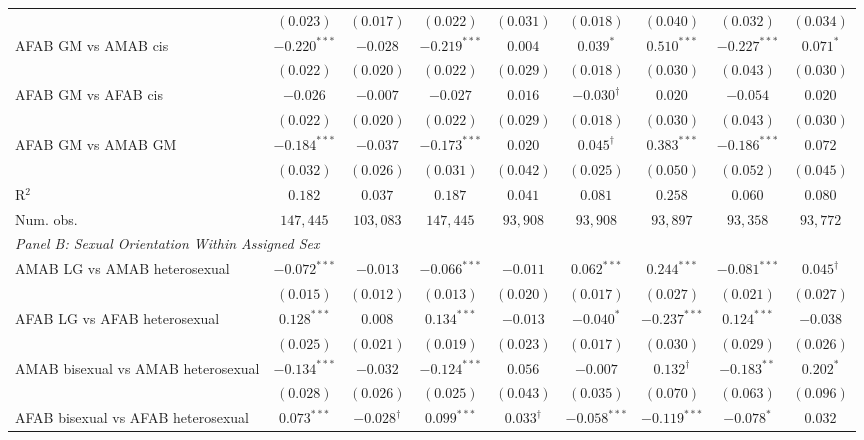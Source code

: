 \begin{table}[htpb!]
{\begin{tabular}{l c c c c c c c c}
 & $(0.023)$ & $(0.017)$ & $(0.022)$ & $(0.031)$ & $(0.018)$ & $(0.040)$ & $(0.032)$ & $(0.034)$ \\
AFAB GM vs AMAB cis & $-0.220^{***}$ & $-0.028$ & $-0.219^{***}$ & $0.004$ & $0.039^{*}$ & $0.510^{***}$ & $-0.227^{***}$ & $0.071^{*}$ \\
 & $(0.022)$ & $(0.020)$ & $(0.022)$ & $(0.029)$ & $(0.018)$ & $(0.030)$ & $(0.043)$ & $(0.030)$ \\
AFAB GM vs AFAB cis & $-0.026$ & $-0.007$ & $-0.027$ & $0.016$ & $-0.030^{\dagger}$ & $0.020$ & $-0.054$ & $0.020$ \\
 & $(0.022)$ & $(0.020)$ & $(0.022)$ & $(0.029)$ & $(0.018)$ & $(0.030)$ & $(0.043)$ & $(0.030)$ \\
AFAB GM vs AMAB GM & $-0.184^{***}$ & $-0.037$ & $-0.173^{***}$ & $0.020$ & $0.045^{\dagger}$ & $0.383^{***}$ & $-0.186^{***}$ & $0.072$ \\
 & $(0.032)$ & $(0.026)$ & $(0.031)$ & $(0.042)$ & $(0.025)$ & $(0.050)$ & $(0.052)$ & $(0.045)$ \\
\hline
R$^2$ & $0.182$ & $0.037$ & $0.187$ & $0.041$ & $0.081$ & $0.258$ & $0.060$ & $0.080$ \\
Num. obs. & $147,445$ & $103,083$ & $147,445$ & $93,908$ & $93,908$ & $93,897$ & $93,358$ & $93,772$ \\
\hline
\multicolumn{9}{l}{\textit{Panel B: Sexual Orientation Within Assigned Sex}} \\
AMAB LG vs AMAB heterosexual & $-0.072^{***}$ & $-0.013$ & $-0.066^{***}$ & $-0.011$ & $0.062^{***}$ & $0.244^{***}$ & $-0.081^{***}$ & $0.045^{\dagger}$ \\
 & $(0.015)$ & $(0.012)$ & $(0.013)$ & $(0.020)$ & $(0.017)$ & $(0.027)$ & $(0.021)$ & $(0.027)$ \\
AFAB LG vs AFAB heterosexual & $0.128^{***}$ & $0.008$ & $0.134^{***}$ & $-0.013$ & $-0.040^{*}$ & $-0.237^{***}$ & $0.124^{***}$ & $-0.038$ \\
 & $(0.025)$ & $(0.021)$ & $(0.019)$ & $(0.023)$ & $(0.017)$ & $(0.030)$ & $(0.029)$ & $(0.026)$ \\
AMAB bisexual vs AMAB heterosexual & $-0.134^{***}$ & $-0.032$ & $-0.124^{***}$ & $0.056$ & $-0.007$ & $0.132^{\dagger}$ & $-0.183^{**}$ & $0.202^{*}$ \\
 & $(0.028)$ & $(0.026)$ & $(0.025)$ & $(0.043)$ & $(0.035)$ & $(0.070)$ & $(0.063)$ & $(0.096)$ \\
AFAB bisexual vs AFAB heterosexual & $0.073^{***}$ & $-0.028^{\dagger}$ & $0.099^{***}$ & $0.033^{\dagger}$ & $-0.058^{***}$ & $-0.119^{***}$ & $-0.078^{*}$ & $0.032$ \\

\end{tabular}}
\end{table}
